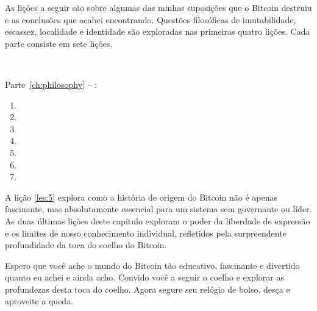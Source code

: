As lições a seguir são sobre algumas das minhas suposições que o Bitcoin destruiu e as conclusões que acabei encontrando. Questões filosóficas de imutabilidade, escassez, localidade e identidade são exploradas nas primeiras quatro lições. Cada parte consiste em sete lições.

~

\begin{samepage}
Parte~\ref{ch:philosophy} -- :

\begin{enumerate}
  \item {}
  \item {}
  \item {}
  \item {}
  \item {}
  \item {}
  \item {}
\end{enumerate}
\end{samepage}

A lição \ref{les:5} explora como a história de origem do Bitcoin não é apenas fascinante, mas absolutamente essencial para um sistema sem governante ou líder. As duas últimas lições deste capítulo exploram o poder da liberdade de expressão e os limites de nosso conhecimento individual, refletidos pela surpreendente profundidade da toca do coelho do Bitcoin.

Espero que você ache o mundo do Bitcoin tão educativo, fascinante e divertido quanto eu achei e ainda acho. Convido você a seguir o coelho e explorar as profundezas desta toca do coelho. Agora segure seu relógio de bolso, desça e aproveite a queda.